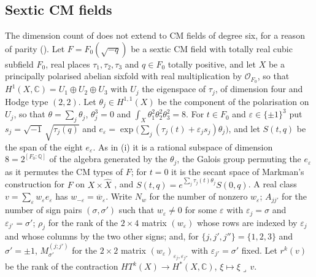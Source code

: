 \documentclass[11pt,reqno]{amsart}
\theoremstyle{plain}
\theoremstyle{definition}
\theoremstyle{remark}
\newcommand{\QQ}{\mathbb{Q}}
\newcommand{\CC}{\mathbb{C}}
\newcommand{\cO}{\mathcal{O}}
\newcommand{\bbar}[1]{\overline{#1}}
\begin{document}
\subsection{Sextic CM fields}\label{ssec:sextic}

The dimension count of  does not extend to CM
fields of degree six, for a reason of parity (). Let
$F=F_{0}(\sqrt{-q})$ be a sextic CM field with totally
real cubic subfield $F_{0}$, real places $\tau_{1},\tau_{2},\tau_{3}$ and $q\in
F_{0}$ totally positive, and let $X$ be a principally polarised abelian sixfold
with real multiplication by $\cO_{F_{0}}$, so that
$H^{1}(X,\CC)=U_{1}\oplus U_{2}\oplus U_{3}$ with $U_{j}$ the eigenspace of
$\tau_{j}$, of dimension four and Hodge type $(2,2)$. Let
$\theta_{j}\in H^{1,1}(X)$ be the component of the polarisation on $U_{j}$, so
that $\theta=\sum_{j}\theta_{j}$, $\theta_{j}^{3}=0$ and
$\int_{X}\theta_{1}^{2}\theta_{2}^{2}\theta_{3}^{2}=8$. For $t\in F_{0}$ and
$\varepsilon\in\{\pm1\}^{3}$ put $s_{j}=\sqrt{-1}\,\sqrt{\tau_{j}(q)}$ and
$e_{\varepsilon}=\exp\bigl(\sum_{j}(\tau_{j}(t)+\varepsilon_{j}s_{j})\theta_{j}\bigr)$,
and let $S(t,q)$ be the span of the eight $e_{\varepsilon}$. As in
(i) it is a rational subspace of dimension
$8=2^{[F_{0}:\QQ]}$ of the algebra generated by the $\theta_{j}$, the Galois
group permuting the $e_{\varepsilon}$ as it permutes the CM types of $F$; for
$t=0$ it is the secant space of Markman's construction for $F$ on
$X\times\widehat{X}$ \cite[\S11.1]{Mar25c}, and
$S(t,q)=e^{\sum_{j}\tau_{j}(t)\theta_{j}}S(0,q)$. A real class
$v=\sum_{\varepsilon}w_{\varepsilon}e_{\varepsilon}$ has
$w_{-\varepsilon}=\bbar{w}_{\varepsilon}$. Write $N_{w}$ for the number of
nonzero $w_{\varepsilon}$; $A_{jj'}$ for the number of sign pairs
$(\sigma,\sigma')$ such that $w_{\varepsilon}\ne0$ for some $\varepsilon$ with
$\varepsilon_{j}=\sigma$ and $\varepsilon_{j'}=\sigma'$; $\rho_{j}$ for the rank
of the $2\times4$ matrix $(w_{\varepsilon})$ whose rows are indexed by
$\varepsilon_{j}$ and whose columns by the two other signs; and, for
$\{j,j',j''\}=\{1,2,3\}$ and $\sigma'=\pm1$, $M^{(j;j')}_{\sigma'}$ for the
$2\times2$ matrix $(w_{\varepsilon})_{\varepsilon_{j},\varepsilon_{j''}}$ with
$\varepsilon_{j'}=\sigma'$ fixed. Let $r^{k}(v)$ be the rank of the contraction
$HT^{k}(X)\to H^{*}(X,\CC)$, $\xi\mapsto\xi\lrcorner\,v$.
\end{document}
